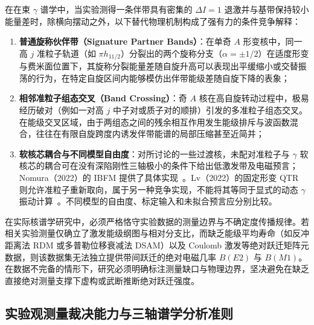 在在束 $\gamma$ 谱学中，当实验测得一条伴带具有密集的 $\Delta I = 1$ 退激并与基带保持较小能量差时，除横向摆动之外，以下替代物理机制构成了强有力的条件竞争解释：
\begin{enumerate}
\item \textbf{普通旋称伙伴带（Signature Partner Bands）}：在单奇 $A$ 形变核中，同一高 $j$ 准粒子轨道（如 $\pi h_{11/2}$）分裂出的两个旋称分支（$\alpha = \pm 1/2$）在适度形变与费米面位置下，其旋称分裂能量差随自旋升高可以表现出平缓缩小或交替振荡的行为，在特定自旋区间内能够模仿出伴带能级差随自旋下降的表象；
\item \textbf{相邻准粒子组态交叉（Band Crossing）}：奇 $A$ 核在高自旋转动过程中，极易经历破对（例如一对高 $j$ 中子对或质子对的顺排）引发的多准粒子组态交叉。在能级交叉区域，由于两组态之间的残余相互作用发生能级排斥与波函数混合，往往在有限自旋跨度内诱发伴带能谱的局部压缩甚至近简并；
\item \textbf{软核芯耦合与不同模型自由度}：对所讨论的一些过渡核，未配对准粒子与 $\gamma$ 软核芯的耦合可在没有深陷刚性三轴极小的条件下给出低激发带及电磁预言；Nomura（2022）的 IBFM 提供了具体实现~\cite{nomura-2022-questioning-wobbling-ibfm}。Lv（2022）的固定形变 QTR 则允许准粒子重新取向，属于另一种竞争实现，不能将其等同于显式的动态 $\gamma$ 振动计算~\cite{lv-2022-evidence-against-wobbling-135pr}。不同模型的自由度、标定输入和未拟合预言应分别比较。
\end{enumerate}

在实际核谱学研究中，必须严格恪守实验数据的测量边界与不确定度传播规律。若相关实验测量仅确立了激发能级纲图与相对分支比，而缺乏能级平均寿命（如反冲距离法 RDM 或多普勒位移衰减法 DSAM）以及 Coulomb 激发等绝对跃迁矩阵元数据，则该数据集无法独立提供带间跃迁的绝对电磁几率 $B(E2)$ 与 $B(M1)$。在数据不完备的情形下，研究必须明确标注测量缺口与物理边界，坚决避免在缺乏直接绝对测量支撑下虚构或武断推断绝对跃迁强度。

\subsection{实验观测量裁决能力与三轴谱学分析准则}\label{sec:3-4-5}

